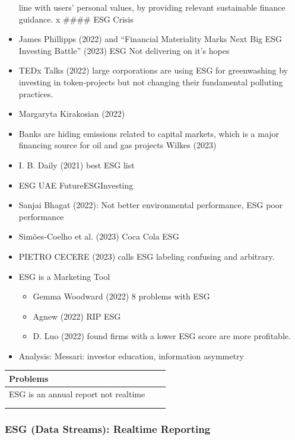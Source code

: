 \documentclass[
  letterpaper,
  DIV=11,
  numbers=noendperiod]{scrartcl}
\providecommand{\tightlist}{%
  \setlength{\itemsep}{0pt}\setlength{\parskip}{0pt}}\usepackage{longtable,booktabs,array}
\begin{document}
\begin{itemize}
  line with users' personal values, by providing relevant sustainable
  finance guidance. x \#\#\#\# ESG Crisis
\item
  James Phillipps (2022) and {``Financial {Materiality Marks Next Big
  ESG Investing Battle}''} (2023) ESG Not delivering on it's hopes
\item
  TEDx Talks (2022) large corporations are using ESG for greenwashing by
  investing in token-projects but not changing their fundamental
  polluting practices.
\item
  Margaryta Kirakosian (2022)
\item
  Banks are hiding emissions related to capital markets, which is a
  major financing source for oil and gas projects Wilkes (2023)
\item
  I. B. Daily (2021) best ESG list
\item
  ESG UAE FutureESGInvesting
\item
  Sanjai Bhagat (2022): Not better environmental performance, ESG poor
  performance
\item
  Simões-Coelho et al. (2023) Coca Cola ESG
\item
  PIETRO CECERE (2023) calls ESG labeling confusing and arbitrary.
\item
  ESG is a Marketing Tool

  \begin{itemize}
  \tightlist
  \item
    Gemma Woodward (2022) 8 problems with ESG
  \item
    Agnew (2022) RIP ESG
  \item
    D. Luo (2022) found firms with a lower ESG score are more
    profitable.
  \end{itemize}
\item
  Analysis: Messari: investor education, information asymmetry
\end{itemize}

\begin{longtable}[]{@{}lll@{}}
\toprule\noalign{}
Problems & & \\
\midrule\noalign{}
\endhead
\bottomrule\noalign{}
\endlastfoot
ESG is an annual report not realtime & & \\
& & \\
& & \\
\end{longtable}

\subsubsection{ESG (Data Streams): Realtime
Reporting}\label{esg-data-streams-realtime-reporting}
\end{document}
